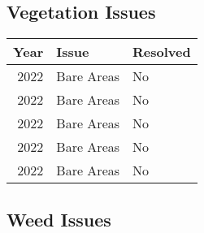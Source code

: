 \documentclass[
  landscape]{article}
\begin{document}
\newpage

\hypertarget{vegetation-issues}{%
\subsection{Vegetation Issues}\label{vegetation-issues}}

\begin{longtable}[]{@{}rll@{}}
\toprule()
Year & Issue & Resolved \\
\midrule()
\endhead
2022 & Bare Areas & No \\
2022 & Bare Areas & No \\
2022 & Bare Areas & No \\
2022 & Bare Areas & No \\
2022 & Bare Areas & No \\
\bottomrule()
\end{longtable}

\newpage

\hypertarget{weed-issues}{%
\subsection{Weed Issues}\label{weed-issues}}
\end{document}
